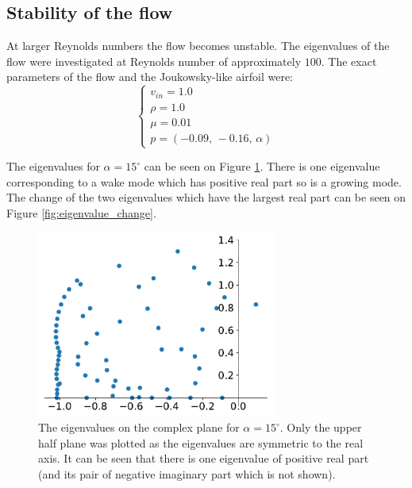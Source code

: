 \documentclass[12pt, a4paper]{article}
\begin{document}
\subsection{Stability of the flow}
At larger Reynolds numbers the flow becomes unstable. The eigenvalues of the flow were investigated at Reynolds number of approximately $100$. The exact parameters of the flow and the Joukowsky-like airfoil were:
\begin{equation}
\begin{cases}
v_{in} = 1.0 \\
\rho = 1.0 \\
\mu = 0.01 \\
p = (-0.09,\, -0.16,\, \alpha)
\end{cases}
\end{equation}

The eigenvalues for $\alpha = 15^\circ$ can be seen on Figure \ref{fig:eigenvalues}. There is one eigenvalue corresponding to a wake mode which has positive real part so is a growing mode. The change of the two eigenvalues which have the largest real part can be seen on Figure \ref{fig:eigenvalue_change}.
\begin{figure}[htbp]
    \centering
    \includegraphics[width=0.7\textwidth]{sValues}
    \caption{The eigenvalues on the complex plane for $\alpha = 15^\circ$. Only the upper half plane was plotted as the eigenvalues are symmetric to the real axis. It can be seen that there is one eigenvalue of positive real part (and its pair of negative imaginary part which is not shown).}
    \label{fig:eigenvalues}
\end{figure}
\end{document}
